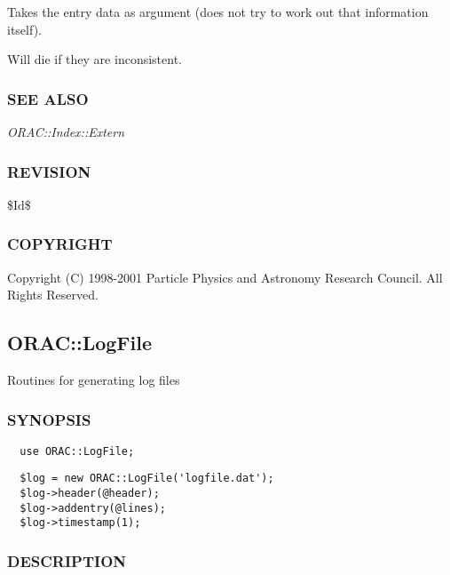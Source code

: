 \begin{description}
\begin{description}
\begin{description}
Takes the entry data as argument (does not try to
work out that information itself).



Will die if they are inconsistent.

\end{description}
\subsubsection*{SEE ALSO\label{ORAC::Index_SEE_ALSO}}


\emph{ORAC::Index::Extern}

\subsubsection*{REVISION\label{ORAC::Index_REVISION}}


\$Id\$

\subsubsection*{COPYRIGHT\label{ORAC::Index_COPYRIGHT}}


Copyright (C) 1998-2001 Particle Physics and Astronomy Research
Council. All Rights Reserved.

\subsection{ORAC::LogFile\label{ORAC::LogFile}}


Routines for generating log files

\subsubsection*{SYNOPSIS\label{ORAC::LogFile_SYNOPSIS}}
\begin{verbatim}
  use ORAC::LogFile;
\end{verbatim}
\begin{verbatim}
  $log = new ORAC::LogFile('logfile.dat');
  $log->header(@header);
  $log->addentry(@lines);
  $log->timestamp(1);
\end{verbatim}
\subsubsection*{DESCRIPTION\label{ORAC::LogFile_DESCRIPTION}}



\end{description}
\end{description}
